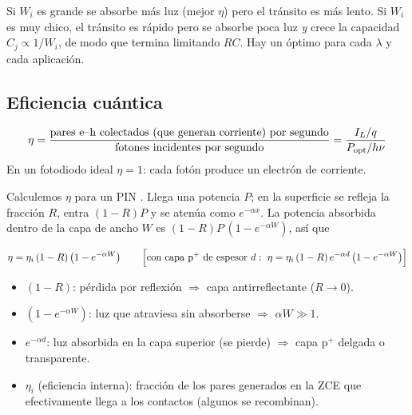 \begin{intuicion}
Si $W_i$ es grande se absorbe más luz (mejor $\eta$) pero el tránsito es más lento.
Si $W_i$ es muy chico, el tránsito es rápido pero se absorbe poca luz \emph{y} crece la
capacidad $C_j\propto1/W_i$, de modo que termina limitando $RC$. Hay un óptimo para cada
$\lambda$ y cada aplicación.
\end{intuicion}

\subsection{Eficiencia cuántica}

\begin{definicion}
\[
  \eta = \frac{\text{pares e--h colectados (que generan corriente) por segundo}}
              {\text{fotones incidentes por segundo}}
       = \frac{I_L/q}{P_{\mathrm{opt}}/h\nu}
\]
En un fotodiodo ideal $\eta=1$: cada fotón produce un electrón de corriente.
\end{definicion}

Calculemos $\eta$ para un PIN . Llega una potencia $P$; en la superficie se
refleja la fracción $R$, entra $(1-R)P$ y se atenúa como $e^{-\alpha x}$. La potencia
absorbida dentro de la capa de ancho $W$ es $(1-R)P\,(1-e^{-\alpha W})$, así que

\begin{clave}
\[
  \eta = \eta_i\,(1-R)\left(1-e^{-\alpha W}\right)
  \qquad\Bigl[\text{con capa p}^+\text{ de espesor } d:\
  \eta = \eta_i\,(1-R)\,e^{-\alpha d}\left(1-e^{-\alpha W}\right)\Bigr]
\]
\begin{itemize}[nosep]
  \item $(1-R)$: pérdida por reflexión $\Rightarrow$ capa antirreflectante ($R\to0$).
  \item $(1-e^{-\alpha W})$: luz que atraviesa sin absorberse $\Rightarrow$ $\alpha W\gg1$.
  \item $e^{-\alpha d}$: luz absorbida en la capa superior (se pierde) $\Rightarrow$ capa
  p$^+$ delgada o transparente.
  \item $\eta_i$ (eficiencia interna): fracción de los pares generados en la ZCE que
  efectivamente llega a los contactos (algunos se recombinan).
\end{itemize}
\end{clave}

